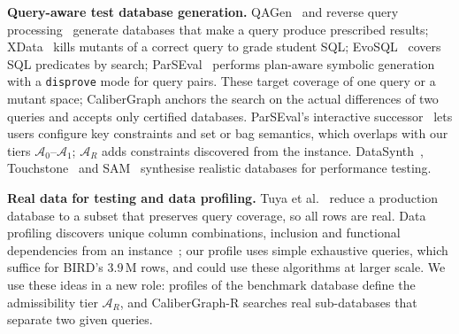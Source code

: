 \textbf{Query-aware test database generation.} QAGen~\cite{binnig2007qagen} and reverse query processing~\cite{binnig2007rqp} generate databases that make a query produce prescribed results; XData~\cite{chandra2015xdata} kills mutants of a correct query to grade student SQL; EvoSQL~\cite{castelein2018evosql} covers SQL predicates by search; ParSEval~\cite{chen2025parseval,chen2026parsevaldemo} performs plan-aware symbolic generation with a \texttt{disprove} mode for query pairs. These target coverage of one query or a mutant space; CaliberGraph anchors the search on the actual differences of two queries and accepts only certified databases. ParSEval's interactive successor~\cite{chen2026parsevaldemo} lets users configure key constraints and set or bag semantics, which overlaps with our tiers $\mathcal A_0$--$\mathcal A_1$; $\mathcal A_R$ adds constraints discovered from the instance. DataSynth~\cite{arasu2011datasynth}, Touchstone~\cite{li2018touchstone} and SAM~\cite{yang2022sam} synthesise realistic databases for performance testing.

\textbf{Real data for testing and data profiling.} Tuya et al.~\cite{tuya2016reduction} reduce a production database to a subset that preserves query coverage, so all rows are real. Data profiling discovers unique column combinations, inclusion and functional dependencies from an instance~\cite{abedjan2015profiling,papenbrock2016hyfd,papenbrock2015binder}; our profile uses simple exhaustive queries, which suffice for BIRD's 3.9\,M rows, and could use these algorithms at larger scale. We use these ideas in a new role: profiles of the benchmark database define the admissibility tier $\mathcal A_R$, and CaliberGraph-R searches real sub-databases that separate two given queries.
